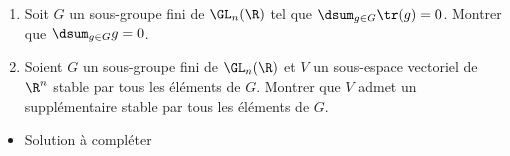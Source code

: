 \begin{enonce}
\begin{exercise}[ID={RMS134 E572},subtitle={Oral
    Mines-Ponts},theme={algebre},annee={2023},concours={mines-ponts},filiere={MP}, difficulty={0}] 
  \begin{enumerate}
  \item Soit $G$ un sous-groupe fini de $\GL_n(\R)$ tel que
    $\dsum_{g\in G}\tr(g)=0$. Montrer que $\dsum_{g\in G}g=0$.
  \item Soient $G$ un sous-groupe fini de $\GL_n(\R)$ et $V$ un
    sous-espace vectoriel de $\R^n$ stable par tous les éléments de
    $G$. Montrer que $V$ admet un supplémentaire stable par tous les
    éléments de $G$.
  \end{enumerate}
\end{exercise}
\begin{solution}
  \begin{itemize}
  \item Solution à compléter
  \end{itemize}
\end{solution}
\end{enonce}